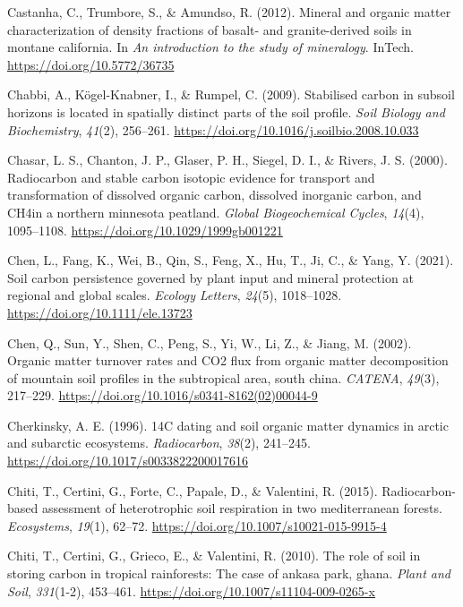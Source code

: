 \documentclass[]{article}
\begin{document}
\leavevmode\hypertarget{ref-Castanha_2012}{}%
Castanha, C., Trumbore, S., \& Amundso, R. (2012). Mineral and organic
matter characterization of density fractions of basalt- and
granite-derived soils in montane california. In \emph{An introduction to
the study of mineralogy}. InTech. \url{https://doi.org/10.5772/36735}

\leavevmode\hypertarget{ref-Chabbi_2009}{}%
Chabbi, A., Kögel-Knabner, I., \& Rumpel, C. (2009). Stabilised carbon
in subsoil horizons is located in spatially distinct parts of the soil
profile. \emph{Soil Biology and Biochemistry}, \emph{41}(2), 256--261.
\url{https://doi.org/10.1016/j.soilbio.2008.10.033}

\leavevmode\hypertarget{ref-Chasar_2000}{}%
Chasar, L. S., Chanton, J. P., Glaser, P. H., Siegel, D. I., \& Rivers,
J. S. (2000). Radiocarbon and stable carbon isotopic evidence for
transport and transformation of dissolved organic carbon, dissolved
inorganic carbon, and CH4in a northern minnesota peatland. \emph{Global
Biogeochemical Cycles}, \emph{14}(4), 1095--1108.
\url{https://doi.org/10.1029/1999gb001221}

\leavevmode\hypertarget{ref-Chen_2021}{}%
Chen, L., Fang, K., Wei, B., Qin, S., Feng, X., Hu, T., Ji, C., \& Yang,
Y. (2021). Soil carbon persistence governed by plant input and mineral
protection at regional and global scales. \emph{Ecology Letters},
\emph{24}(5), 1018--1028. \url{https://doi.org/10.1111/ele.13723}

\leavevmode\hypertarget{ref-Chen_2002}{}%
Chen, Q., Sun, Y., Shen, C., Peng, S., Yi, W., Li, Z., \& Jiang, M.
(2002). Organic matter turnover rates and CO2 flux from organic matter
decomposition of mountain soil profiles in the subtropical area, south
china. \emph{CATENA}, \emph{49}(3), 217--229.
\url{https://doi.org/10.1016/s0341-8162(02)00044-9}

\leavevmode\hypertarget{ref-Cherkinsky_1996}{}%
Cherkinsky, A. E. (1996). 14C dating and soil organic matter dynamics in
arctic and subarctic ecosystems. \emph{Radiocarbon}, \emph{38}(2),
241--245. \url{https://doi.org/10.1017/s0033822200017616}

\leavevmode\hypertarget{ref-Chiti_2015}{}%
Chiti, T., Certini, G., Forte, C., Papale, D., \& Valentini, R. (2015).
Radiocarbon-based assessment of heterotrophic soil respiration in two
mediterranean forests. \emph{Ecosystems}, \emph{19}(1), 62--72.
\url{https://doi.org/10.1007/s10021-015-9915-4}

\leavevmode\hypertarget{ref-Chiti_2010}{}%
Chiti, T., Certini, G., Grieco, E., \& Valentini, R. (2010). The role of
soil in storing carbon in tropical rainforests: The case of ankasa park,
ghana. \emph{Plant and Soil}, \emph{331}(1-2), 453--461.
\url{https://doi.org/10.1007/s11104-009-0265-x}
\end{document}
